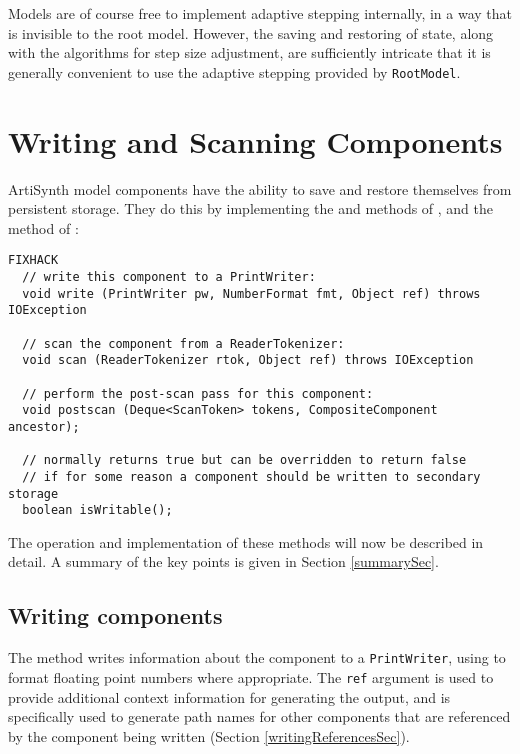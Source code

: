 \documentclass{article}
\begin{document}
\begin{sideblock}
Models are of course free to implement adaptive stepping internally, in a
way that is invisible to the root model. However, the saving and
restoring of state, along with the algorithms for step size
adjustment, are sufficiently intricate that it is generally
convenient to use the adaptive stepping provided by {\tt RootModel}.
\end{sideblock}

\section{Writing and Scanning Components}
\label{writingAndScanningSec}

\setjavabase{}

ArtiSynth model components have the ability to save and restore
themselves from persistent storage. They do this by implementing the
 and 
 methods of
, and the 
method of :

\begin{lstlisting}FIXHACK
  // write this component to a PrintWriter:
  void write (PrintWriter pw, NumberFormat fmt, Object ref) throws IOException

  // scan the component from a ReaderTokenizer:
  void scan (ReaderTokenizer rtok, Object ref) throws IOException

  // perform the post-scan pass for this component:
  void postscan (Deque<ScanToken> tokens, CompositeComponent ancestor);

  // normally returns true but can be overridden to return false 
  // if for some reason a component should be written to secondary storage
  boolean isWritable();
\end{lstlisting}

The operation and implementation of these methods will now be
described in detail. A summary of the key points is given in Section
\ref{summarySec}.

\subsection{Writing components}

The  method writes
information about the component to a {\tt PrintWriter}, using
 to format floating point
numbers where appropriate. The {\tt ref} argument is used to provide
additional context information for generating the output, and is
specifically used to generate path names for other components
that are referenced by the component being written
(Section \ref{writingReferencesSec}).
\end{document}
